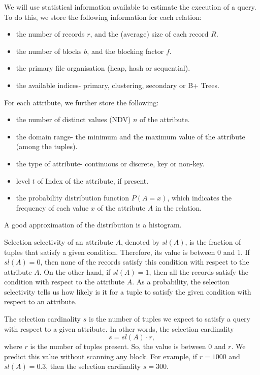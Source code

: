 \documentclass[a4paper, openany]{memoir}
\theoremstyle{definition}
\theoremstyle{plain}
\begin{document}
We will use statistical information available to estimate the execution of a query. To do this, we store the following information for each relation:
\begin{itemize}
    \item the number of records $r$, and the (average) size of each record $R$.
    \item the number of blocks $b$, and the blocking factor $f$.
    \item the primary file organisation (heap, hash or sequential).
    \item the available indices- primary, clustering, secondary or B+ Trees.
\end{itemize}
For each attribute, we further store the following:
\begin{itemize}
    \item the number of distinct values (NDV) $n$ of the attribute.
    \item the domain range- the minimum and the maximum value of the attribute (among the tuples).
    \item the type of attribute- continuous or discrete, key or non-key.
    \item level $t$ of Index of the attribute, if present.
    \item the probability distribution function $P(A = x)$, which indicates the frequency of each value $x$ of the attribute $A$ in the relation.
\end{itemize}
A good approximation of the distribution is a histogram.

Selection selectivity of an attribute $A$, denoted by $\textit{sl}(A)$, is the fraction of tuples that satisfy a given condition. Therefore, its value is between 0 and 1. If $\textit{sl}(A) = 0$, then none of the records satisfy this condition with respect to the attribute $A$. On the other hand, if $\textit{sl}(A) = 1$, then all the records satisfy the condition with respect to the attribute $A$. As a probability, the selection selectivity tells us how likely is it for a tuple to satisfy the given condition with respect to an attribute.

The selection cardinality $s$ is the number of tuples we expect to satisfy a query with respect to a given attribute. In other words, the selection cardinality
\[s = \textit{sl}(A) \cdot r,\]
where $r$ is the number of tuples present. So, the value is between 0 and $r$. We predict this value without scanning any block. For example, if $r = 1000$ and $\textit{sl}(A) = 0.3$, then the selection cardinality $s = 300$. 
\end{document}
